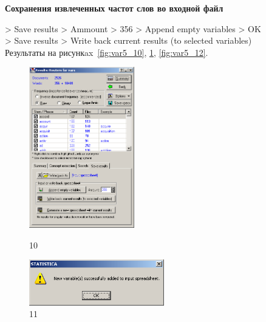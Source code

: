 \begin{center}
  \textbf{Сохранения извлеченных частот слов во входной файл}
\end{center}

> Save results > Ammount > 356 > Append empty variables > OK \\
> Save results > Write back current results (to selected variables) \\

Результаты на рисункax~\ref{fig:var5_10}, \ref{fig:var5_11}, \ref{fig:var5_12}.

\begin{figure}[!h]
  \centering

  \begin{minipage}{0.49\textwidth}
    \centering

    \includegraphics[height=7cm]
    {inc/var5/10.PNG}

    \caption{10}

    \label{fig:var5_10}
  \end{minipage}
  \begin{minipage}{0.49\textwidth}
    \centering

    \includegraphics[height=2cm]
    {inc/var5/11.PNG}

    \caption{11}

    \label{fig:var5_11}
  \end{minipage}
\end{figure}

